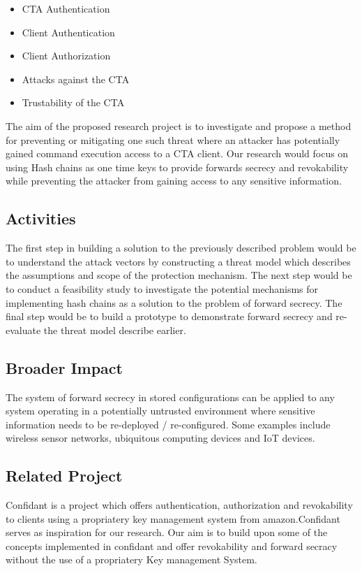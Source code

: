 \documentclass[10pt,conference]{IEEEtran}
\begin{document}
\begin{itemize}
\item CTA Authentication 
\item Client Authentication
\item Client Authorization
\item Attacks against the CTA
\item Trustability of the CTA
\end{itemize}

The aim of the proposed research project is to investigate and propose a method for preventing or 
mitigating one such threat where an attacker has potentially gained command execution access to a 
CTA client. Our research would focus on using Hash chains as one time keys to provide 
forwards secrecy\cite{conti_ripp-fs:_2007} and revokability while preventing the attacker from 
gaining access to any sensitive information.

\subsection{Activities}

The first step in building a solution to the previously described problem would be to understand the 
attack vectors by constructing a threat model which describes the assumptions and scope of the 
protection mechanism. The next step would be to conduct a feasibility study to investigate the 
potential mechanisms for implementing hash chains as a solution to the problem of forward secrecy. 
The final step would be to build a prototype to demonstrate forward secrecy and re-evaluate the 
threat model describe earlier.

\subsection{Broader Impact}

The system of forward secrecy in stored configurations can be applied to any system operating in a 
potentially untrusted environment where sensitive information needs to be re-deployed / 
re-configured. Some examples include wireless sensor networks, ubiquitous computing devices and IoT 
devices.


\subsection{Related Project}
Confidant\cite{lyft_confidant:_2016} is a project which offers authentication, authorization 
and revokability to clients using a propriatery key management system from amazon.Confidant serves 
as inspiration for our research. Our aim is to build upon some of the concepts implemented in 
confidant and offer revokability and forward secracy without the use of a propriatery Key management 
System.
\end{document}
